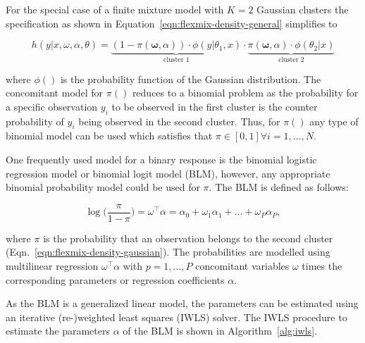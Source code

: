 \documentclass[article,nojss,shortnames]{jss}
\begin{document}
For the special case of a finite mixture model with $K=2$ Gaussian clusters
the specification as shown in Equation~\ref{eqn:flexmix-density-general} simplifies to

\begin{equation}
    h(\mathit{y} | \mathit{x}, \mathit{\omega}, \mathit{\alpha}, \mathit{\theta}) =
        \underbrace{
            (1 - \mathit{\pi}(\mathbf{\omega}, \mathit{\alpha})) \cdot
            \phi(\mathit{y} | \mathit{\theta}_1, \mathit{x})
        }_{\text{cluster 1}}
        \cdot
        \underbrace{
            \mathit{\pi}(\mathbf{\omega}, \mathit{\alpha}) \cdot \phi(\mathit{\theta}_2|\mathit{x})
        }_{\text{cluster 2}}
    \label{eqn:flexmix-density-gaussian}
\end{equation}

where $\phi()$ is the probability function of the Gaussian distribution.
The concomitant model for $\pi()$ reduces to a binomial problem as the probability
for a specific observation $y_i$ to be observed in the first cluster is the
counter probability of $y_i$ being observed in the second cluster.
Thus, for $\pi()$ any type of binomial model can be used which satisfies
that $\pi \in [0,1] \forall i=1,\dots,N$.

One frequently used model for a binary response is the binomial logistic regression
model or binomial logit model (BLM), however, any appropriate binomial probability
model could be used for $\pi$.
The BLM is defined as follows:

\begin{equation}
    \log\Big(\frac{\pi}{1 - \pi}\Big) =
        \omega^\top \alpha = \alpha_0 + \omega_1 \alpha_1 + \dots + \omega_P \alpha_P,
\end{equation}

where $\mathit{\pi}$ is the probability that an observation belongs to the
second cluster (Eqn.~\ref{eqn:flexmix-density-gaussian}).
The probabilities are modelled using multilinear regression
$\mathit{\omega}^\top \mathit{\alpha}$ with $p=1,\dots,P$ concomitant
variables $\mathit{\omega}$ times the corresponding parameters or regression
coefficients $\mathit{\alpha}$.

As the BLM is a generalized linear model, the parameters can be estimated using
an iterative (re-)weighted least squares (IWLS) solver.
The IWLS procedure to estimate the parameters $\mathit{\alpha}$ of the BLM
is shown in Algorithm~\ref{alg:iwls}.
\end{document}

